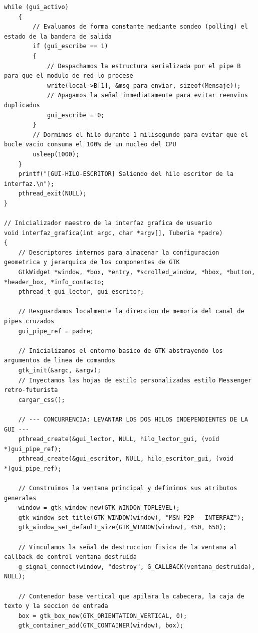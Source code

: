 \begin{lstlisting}[style=estiloC, caption={Archivo del Front-End (conexion P2P)}]
    while (gui_activo)
    {
        // Evaluamos de forma constante mediante sondeo (polling) el estado de la bandera de salida
        if (gui_escribe == 1)
        {
            // Despachamos la estructura serializada por el pipe B para que el modulo de red lo procese
            write(local->B[1], &msg_para_enviar, sizeof(Mensaje));
            // Apagamos la señal inmediatamente para evitar reenvios duplicados
            gui_escribe = 0; 
        }
        // Dormimos el hilo durante 1 milisegundo para evitar que el bucle vacio consuma el 100% de un nucleo del CPU
        usleep(1000); 
    }
    printf("[GUI-HILO-ESCRITOR] Saliendo del hilo escritor de la interfaz.\n");
    pthread_exit(NULL);
}

// Inicializador maestro de la interfaz grafica de usuario
void interfaz_grafica(int argc, char *argv[], Tuberia *padre)
{
    // Descriptores internos para almacenar la configuracion geometrica y jerarquica de los componentes de GTK
    GtkWidget *window, *box, *entry, *scrolled_window, *hbox, *button, *header_box, *info_contacto;
    pthread_t gui_lector, gui_escritor;

    // Resguardamos localmente la direccion de memoria del canal de pipes cruzados
    gui_pipe_ref = padre;

    // Inicializamos el entorno basico de GTK abstrayendo los argumentos de linea de comandos
    gtk_init(&argc, &argv);
    // Inyectamos las hojas de estilo personalizadas estilo Messenger retro-futurista
    cargar_css();

    // --- CONCURRENCIA: LEVANTAR LOS DOS HILOS INDEPENDIENTES DE LA GUI ---
    pthread_create(&gui_lector, NULL, hilo_lector_gui, (void *)gui_pipe_ref);
    pthread_create(&gui_escritor, NULL, hilo_escritor_gui, (void *)gui_pipe_ref);

    // Construimos la ventana principal y definimos sus atributos generales
    window = gtk_window_new(GTK_WINDOW_TOPLEVEL);
    gtk_window_set_title(GTK_WINDOW(window), "MSN P2P - INTERFAZ");
    gtk_window_set_default_size(GTK_WINDOW(window), 450, 650);

    // Vinculamos la señal de destruccion fisica de la ventana al callback de control ventana_destruida
    g_signal_connect(window, "destroy", G_CALLBACK(ventana_destruida), NULL);

    // Contenedor base vertical que apilara la cabecera, la caja de texto y la seccion de entrada
    box = gtk_box_new(GTK_ORIENTATION_VERTICAL, 0);
    gtk_container_add(GTK_CONTAINER(window), box);


\end{lstlisting}
